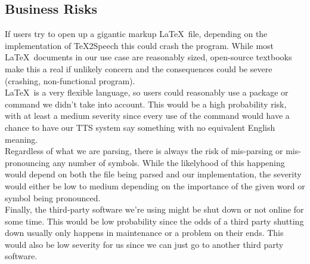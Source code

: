 \subsection{Business Risks}
If users try to open up a gigantic markup \LaTeX\ file, depending on the implementation of \TeX 2Speech this could crash the program. While most \LaTeX\ documents in our use case are reasonably sized, open-source textbooks make this a real if unlikely concern and the consequences could be severe (crashing, non-functional program). \\

\noindent \LaTeX\ is a very flexible language, so users could reasonably use a package or command we didn’t take into account. This would be a high probability risk, with at least a medium severity since every use of the command would have a chance to have our TTS system say something with no equivalent English meaning.\\

\noindent Regardless of what we are parsing, there is always the risk of mis-parsing or mis-pronouncing any number of symbols. While the likelyhood of this happening would depend on both the file being parsed and our implementation, the severity would either be low to medium depending on the importance of the given word or symbol being pronounced.\\

\noindent Finally, the third-party software we’re using might be shut down or not online for some time. This would be low probability since the odds of a third party shutting down usually only happens in maintenance or a problem on their ends. This would also be low severity for us since we can just go to another third party software. 

